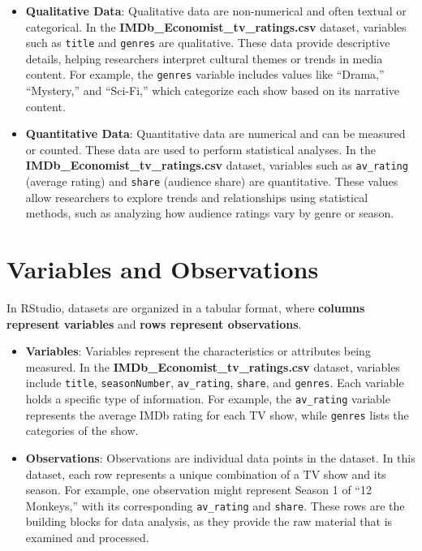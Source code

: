 \documentclass[
]{book}
\begin{document}
\begin{itemize}
\item
  \textbf{Qualitative Data}: Qualitative data are non-numerical and often textual or categorical. In the \textbf{IMDb\_Economist\_tv\_ratings.csv} dataset, variables such as \texttt{title} and \texttt{genres} are qualitative. These data provide descriptive details, helping researchers interpret cultural themes or trends in media content. For example, the \texttt{genres} variable includes values like ``Drama,'' ``Mystery,'' and ``Sci-Fi,'' which categorize each show based on its narrative content.
\item
  \textbf{Quantitative Data}: Quantitative data are numerical and can be measured or counted. These data are used to perform statistical analyses. In the \textbf{IMDb\_Economist\_tv\_ratings.csv} dataset, variables such as \texttt{av\_rating} (average rating) and \texttt{share} (audience share) are quantitative. These values allow researchers to explore trends and relationships using statistical methods, such as analyzing how audience ratings vary by genre or season.
\end{itemize}

\section{Variables and Observations}\label{variables-and-observations}

In RStudio, datasets are organized in a tabular format, where \textbf{columns represent variables} and \textbf{rows represent observations}.

\begin{itemize}
\item
  \textbf{Variables}: Variables represent the characteristics or attributes being measured. In the \textbf{IMDb\_Economist\_tv\_ratings.csv} dataset, variables include \texttt{title}, \texttt{seasonNumber}, \texttt{av\_rating}, \texttt{share}, and \texttt{genres}. Each variable holds a specific type of information. For example, the \texttt{av\_rating} variable represents the average IMDb rating for each TV show, while \texttt{genres} lists the categories of the show.
\item
  \textbf{Observations}: Observations are individual data points in the dataset. In this dataset, each row represents a unique combination of a TV show and its season. For example, one observation might represent Season 1 of ``12 Monkeys,'' with its corresponding \texttt{av\_rating} and \texttt{share}. These rows are the building blocks for data analysis, as they provide the raw material that is examined and processed.
\end{itemize}
\end{document}

